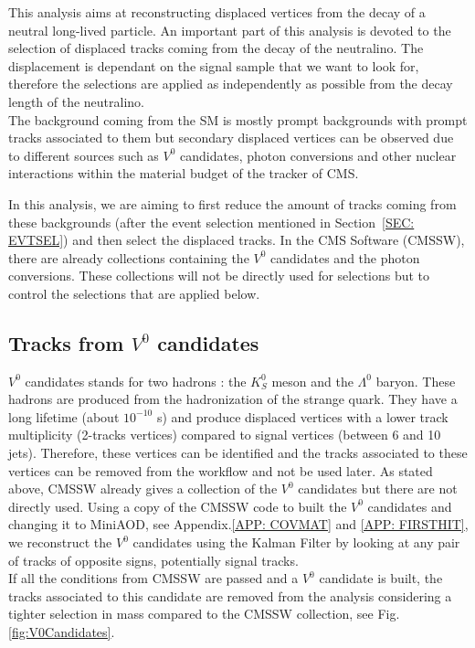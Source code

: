 \documentclass{cernatlasnote}
\begin{document}
This analysis aims at reconstructing displaced vertices from the decay of a neutral long-lived particle. An important part of this analysis is devoted to the selection of displaced tracks coming from the decay of the neutralino. The displacement is dependant on the signal sample that we want to look for, therefore the selections are  applied as independently as possible from the decay length of the neutralino.\\

The background coming from the SM is mostly prompt backgrounds with prompt tracks associated to them but secondary displaced vertices can be observed due to different sources such as $V^0$ candidates, photon conversions and other nuclear interactions within the material budget of the tracker of CMS.

In this analysis, we are aiming to first reduce the amount of tracks coming from these backgrounds (after the event selection mentioned in Section~\ref{SEC: EVTSEL}) and then select the displaced tracks. In the CMS Software (CMSSW), there are already collections containing the $V^0$ candidates and the photon conversions. These collections will not be directly used for selections but to control the selections that are applied below.

\subsection{Tracks from $V^0$ candidates}
$V^0$ candidates stands for two hadrons : the $K^0_S$ meson and the $\Lambda^{0}$ baryon. These hadrons are produced from the hadronization of the strange quark. They have a long lifetime (about $10^{-10}$ s) and produce  displaced vertices with a lower track multiplicity (2-tracks vertices) compared to signal vertices (between 6 and 10 jets). Therefore, these vertices can be identified and the tracks associated to these vertices can be removed from the workflow and not be used later.
As stated above, CMSSW already gives a collection of the $V^0$ candidates \cite{V0CAND} but there are not directly used. Using a copy of the CMSSW code to built the $V^0$ candidates and changing it to MiniAOD, see Appendix.\ref{APP: COVMAT} and \ref{APP: FIRSTHIT}, we reconstruct the  $V^0$ candidates using the Kalman Filter \cite{KVF} by looking at any pair of tracks of opposite signs, potentially signal tracks.\\
If all the conditions from CMSSW are passed and a $V^0$ candidate is built, the tracks associated to this candidate are removed from the analysis considering a tighter selection in mass compared to the CMSSW collection, see Fig.\ref{fig:V0Candidates}.\\
\end{document}
